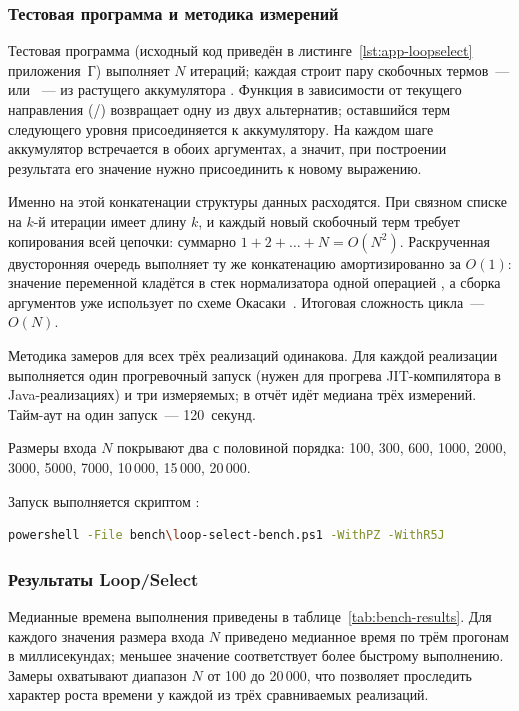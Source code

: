 \subsubsection{Тестовая программа и методика измерений}

Тестовая программа (исходный код приведён в листинге~\ref{lst:app-loopselect}
приложения~Г) выполняет \(N\)
итераций; каждая строит пару скобочных термов~---  или
~--- из растущего аккумулятора . Функция
 в зависимости от текущего направления (/)
возвращает одну из двух альтернатив; оставшийся терм следующего уровня
присоединяется к аккумулятору. На каждом шаге аккумулятор 
встречается в обоих аргументах, а значит, при построении результата
его значение нужно присоединить к новому выражению.

Именно на этой конкатенации структуры данных расходятся. При связном
списке  на $k$-й итерации имеет длину $k$, и каждый новый
скобочный терм требует копирования всей цепочки: суммарно
$1 + 2 + \ldots + N = O(N^2)$. Раскрученная двусторонняя очередь
выполняет ту же конкатенацию амортизированно за $O(1)$: значение
переменной кладётся в стек нормализатора одной операцией
, а сборка аргументов уже использует
 по схеме Окасаки~\cite{okasaki_pfds}. Итоговая
сложность цикла~--- $O(N)$.

Методика замеров для всех трёх реализаций одинакова. Для каждой реализации
выполняется один прогревочный запуск
(нужен для прогрева JIT-компилятора в Java-реализациях)
и три измеряемых; в отчёт идёт медиана трёх измерений.
Тайм-аут на один запуск~--- 120~секунд.

Размеры входа $N$ покрывают два с половиной порядка:
100, 300, 600, 1000, 2000, 3000, 5000, 7000,
10\,000, 15\,000, 20\,000.

Запуск выполняется скриптом :

\begin{lstlisting}[language=bash,caption={Запуск бенчмарка Loop/Select},label={lst:bench-run}]
powershell -File bench\loop-select-bench.ps1 -WithPZ -WithR5J
\end{lstlisting}

\subsubsection{Результаты Loop/Select}

Медианные времена выполнения приведены в таблице~\ref{tab:bench-results}.
Для каждого значения размера входа $N$ приведено медианное время по трём
прогонам в миллисекундах; меньшее значение соответствует более быстрому
выполнению. Замеры охватывают диапазон $N$ от 100 до 20\,000, что позволяет
проследить характер роста времени у каждой из трёх сравниваемых реализаций.

